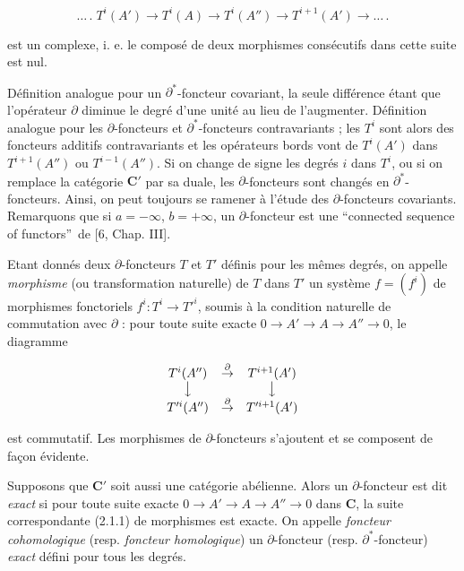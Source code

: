 
\noindent
\[
\tag{2.1.1.}
\ldots\,.\;T^i(A')\to T^i(A)
\to T^i(A'')\to T^{i+1}(A')
\to\ldots\,.
\]

\noindent est un complexe, i. e. le composé de deux morphismes consécutifs
dans cette suite est nul.

Définition analogue pour un $\partial^*$-foncteur covariant, la seule
différence étant que l'opérateur $\partial$ diminue le degré d'une unité au
lieu de l'augmenter. Définition analogue pour les $\partial$-foncteurs et
$\partial^*$-foncteurs contravariants ; les $T^i$ sont alors des foncteurs
additifs contravariants et les opérateurs bords vont de $T^i(A')$ dans
$T^{i+1}(A'')$ ou $T^{i-1}(A'')$. Si on change de signe les degrés $i$ dans
$T^i$, ou si on remplace la catégorie $\mathbf{C}'$ par sa duale, les
$\partial$-foncteurs sont changés en $\partial^*$-foncteurs. Ainsi, on peut
toujours se ramener à l'étude des $\partial$-foncteurs covariants. Remarquons
que si $a=-\infty$, $b=+\infty$, un $\partial$-foncteur est une
\textquotedblleft connected sequence of functors\textquotedblright\ de [6,
Chap. III].

Etant donnés deux $\partial$-foncteurs $T$ et $T'$ définis pour les mêmes
degrés, on appelle \textit{morphisme} (ou transformation naturelle) de $T$
dans $T'$ un système $f=(f^i)$ de morphismes fonctoriels
$f^i:T^i\to T'^i$, soumis à la condition naturelle de commutation
avec $\partial$ : pour toute suite exacte
$0\to A'\to A\to A''\to 0$,
le diagramme

\[
\begin{array}{ccc}
T^i(A'') & \mathop{\to}\limits^{\partial} & T^{i+1}(A')\\
\big\downarrow && \big\downarrow\\
T'^i(A'') & \mathop{\to}\limits^{\partial} & T'^{i+1}(A')
\end{array}
\]

\noindent est commutatif. Les morphismes de $\partial$-foncteurs s'ajoutent
et se composent de façon évidente.

Supposons que $\mathbf{C}'$ soit aussi une catégorie abélienne. Alors un
$\partial$-foncteur est dit \textit{exact} si pour toute suite exacte
$0\to A'\to A\to A''\to 0$
dans $\mathbf{C}$, la suite correspondante (2.1.1) de morphismes est exacte. On appelle
\textit{foncteur cohomologique} (resp. \textit{foncteur homologique}) un
$\partial$-foncteur (resp. $\partial^*$-foncteur) \textit{exact} défini pour tous les
degrés.

